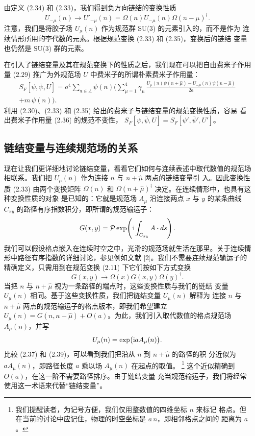 由定义 (2.34) 和 (2.33)，我们得到负方向链结的变换性质
\begin{equation}
  U_{-\mu}(n) \to U'_{-\mu}(n) =
  \Omega(n) U_{-\mu}(n) \Omega(n - \hat\mu)^\dagger .
\end{equation}
注意，我们是将胶子场 $U_\mu(n)$ 作为规范群 SU(3) 的元素引入的，而不是作为
连续情形所用的李代数的元素。根据规范变换 (2.33) 和 (2.35)，变换后的链结
变量也仍然是 SU(3) 群的元素。

在引入了链结变量及其在规范变换下的性质之后，我们现在可以把自由费米子作用
量 (2.29) 推广为外规范场 $U$ 中费米子的所谓朴素费米子作用量：
\begin{equation}
  \begin{split}
    S_F[\psi, \bar\psi, U] = a^4 \sum_{n\in\Lambda}
    \bar\psi(n) \Big( \sum_{\mu=1}^{4} \gamma_\mu\,
      \frac{U_\mu(n)\psi(n + \hat\mu) - U_{-\mu}(n)\psi(n - \hat\mu)}{2a}\\
    + m\,\psi(n) \Big) .
  \end{split}
\end{equation}
利用 (2.30)、(2.33) 和 (2.35) 给出的费米子与链结变量的规范变换性质，容易
看出费米子作用量 (2.36) 的规范不变性，
$S_F[\psi, \bar\psi, U] = S_F[\psi', \bar\psi', U']$。

\subsection{链结变量与连续规范场的关系}

现在让我们更详细地讨论链结变量，看看它们如何与连续表述中取代数值的规范场
相联系。我们把 $U_\mu(n)$ 作为连接 $n$ 与 $n + \hat\mu$ 两点的链结变量引
入。因此变换性质 (2.33) 由两个变换矩阵 $\Omega(n)$ 和
$\Omega(n + \hat\mu)^\dagger$ 决定。在连续情形中，也具有这种变换性质的对象
是已知的：它就是规范场 $A_\mu$ 沿连接两点 $x$ 与 $y$ 的某条曲线 $C_{xy}$
的路径有序指数积分，即所谓的规范输运子：
\begin{equation}
  G(x, y) = \mathcal{P} \exp\!\left( \mathrm{i} \int_{C_{xy}} A \cdot ds \right) .
\end{equation}
我们可以假设格点嵌入在连续时空之中，光滑的规范场就生活在那里。关于连续情
形中路径有序指数的详细讨论，参见例如文献 [2]。我们不需要连续规范输运子的
精确定义，只需用到在规范变换 (2.11) 下它们按如下方式变换
\begin{equation}
  G(x, y) \to \Omega(x) G(x, y) \Omega(y)^\dagger .
\end{equation}
当把 $n$ 与 $n + \hat\mu$ 视为一条路径的端点时，这些变换性质与我们的链结
变量 $U_\mu(n)$ 相同。基于这些变换性质，我们把链结变量 $U_\mu(n)$ 解释为
连接 $n$ 与 $n + \hat\mu$ 两点的规范输运子的格点版本，即我们希望建立
$U_\mu(n) = G(n, n + \hat\mu) + O(a)$。为此，我们引入取代数值的格点规范场
$A_\mu(n)$，并写
\begin{equation}
  U_\mu(n) = \exp\!\big(\mathrm{i} a A_\mu(n)\big) .
\end{equation}
比较 (2.37) 和 (2.39)，可以看到我们把沿从 $n$ 到 $n + \hat\mu$ 的路径的积
分近似为 $aA_\mu(n)$，即路径长度 $a$ 乘以场 $A_\mu(n)$ 在起点的取值。
\footnote{我们提醒读者，为记号方便，我们仅用整数值的四维坐标 $n$ 来标记
格点。但在当前的讨论中应记住，物理的时空坐标是 $a\,n$，即相邻格点之间的
距离为 $a$。} 这个近似精确到 $O(a)$，在这一阶不需要路径排序。由于链结变量
充当规范输运子，我们将经常使用这一术语来代替“链结变量”。

